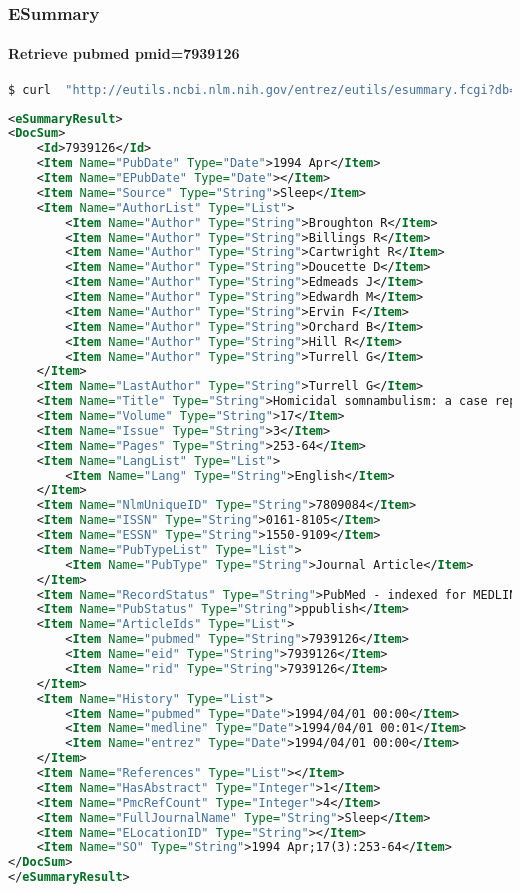 \documentclass{beamer}
\begin{document}
\begin{frame}[fragile]
\frametitle{ESummary}
\framesubtitle{Retrieve pubmed pmid=7939126}
\begin{lstlisting}[language=bash,basicstyle=\tiny,breaklines=true]
$ curl  "http://eutils.ncbi.nlm.nih.gov/entrez/eutils/esummary.fcgi?db=pubmed&id=7939126"
\end{lstlisting}

\begin{lstlisting}[language=xml,basicstyle=\tiny,breaklines=false]
<eSummaryResult>
<DocSum>
	<Id>7939126</Id>
	<Item Name="PubDate" Type="Date">1994 Apr</Item>
	<Item Name="EPubDate" Type="Date"></Item>
	<Item Name="Source" Type="String">Sleep</Item>
	<Item Name="AuthorList" Type="List">
		<Item Name="Author" Type="String">Broughton R</Item>
		<Item Name="Author" Type="String">Billings R</Item>
		<Item Name="Author" Type="String">Cartwright R</Item>
		<Item Name="Author" Type="String">Doucette D</Item>
		<Item Name="Author" Type="String">Edmeads J</Item>
		<Item Name="Author" Type="String">Edwardh M</Item>
		<Item Name="Author" Type="String">Ervin F</Item>
		<Item Name="Author" Type="String">Orchard B</Item>
		<Item Name="Author" Type="String">Hill R</Item>
		<Item Name="Author" Type="String">Turrell G</Item>
	</Item>
	<Item Name="LastAuthor" Type="String">Turrell G</Item>
	<Item Name="Title" Type="String">Homicidal somnambulism: a case report.</Item>
	<Item Name="Volume" Type="String">17</Item>
	<Item Name="Issue" Type="String">3</Item>
	<Item Name="Pages" Type="String">253-64</Item>
	<Item Name="LangList" Type="List">
		<Item Name="Lang" Type="String">English</Item>
	</Item>
	<Item Name="NlmUniqueID" Type="String">7809084</Item>
	<Item Name="ISSN" Type="String">0161-8105</Item>
	<Item Name="ESSN" Type="String">1550-9109</Item>
	<Item Name="PubTypeList" Type="List">
		<Item Name="PubType" Type="String">Journal Article</Item>
	</Item>
	<Item Name="RecordStatus" Type="String">PubMed - indexed for MEDLINE</Item>
	<Item Name="PubStatus" Type="String">ppublish</Item>
	<Item Name="ArticleIds" Type="List">
		<Item Name="pubmed" Type="String">7939126</Item>
		<Item Name="eid" Type="String">7939126</Item>
		<Item Name="rid" Type="String">7939126</Item>
	</Item>
	<Item Name="History" Type="List">
		<Item Name="pubmed" Type="Date">1994/04/01 00:00</Item>
		<Item Name="medline" Type="Date">1994/04/01 00:01</Item>
		<Item Name="entrez" Type="Date">1994/04/01 00:00</Item>
	</Item>
	<Item Name="References" Type="List"></Item>
	<Item Name="HasAbstract" Type="Integer">1</Item>
	<Item Name="PmcRefCount" Type="Integer">4</Item>
	<Item Name="FullJournalName" Type="String">Sleep</Item>
	<Item Name="ELocationID" Type="String"></Item>
	<Item Name="SO" Type="String">1994 Apr;17(3):253-64</Item>
</DocSum>
</eSummaryResult>
\end{lstlisting}
\end{frame}
\end{document}
